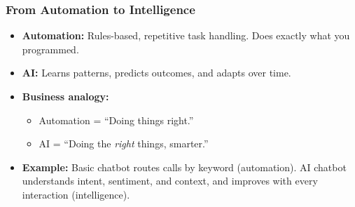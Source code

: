 %
%
%

\begin{frame}[fragile]\frametitle{From Automation to Intelligence}

    \begin{itemize}
      \item \textbf{Automation:} Rules-based, repetitive task handling. Does exactly what you programmed.
      \item \textbf{AI:} Learns patterns, predicts outcomes, and adapts over time.
      \item \textbf{Business analogy:}
        \begin{itemize}
          \item Automation = ``Doing things right.''
          \item AI = ``Doing the \textit{right} things, smarter.''
        \end{itemize}
      \item \textbf{Example:} Basic chatbot routes calls by keyword (automation). AI chatbot understands intent, sentiment, and context, and improves with every interaction (intelligence).
    \end{itemize}
	
\end{frame}

